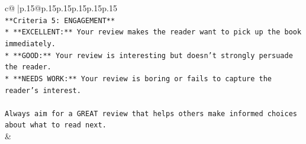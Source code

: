 \documentclass{article}
\begin{document}
{\begin{supertabular}{c@{$\;$}|p{.15\linewidth}@{}p{.15\linewidth}p{.15\linewidth}p{.15\linewidth}p{.15\linewidth}p{.15\linewidth}}
{{{\\ 
\texttt{**Criteria 5: ENGAGEMENT**} \\
\texttt{*   **EXCELLENT:** Your review makes the reader want to pick up the book immediately.} \\
\texttt{*   **GOOD:** Your review is interesting but doesn't strongly persuade the reader.} \\
\texttt{*   **NEEDS WORK:** Your review is boring or fails to capture the reader's interest.} \\
\\ 
\texttt{Always aim for a GREAT review that helps others make informed choices about what to read next.} \\
            }
        }
    }
    & \\ \\


\end{supertabular}}
\end{document}
